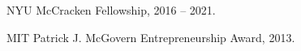 \documentclass[11pt,article,oneside]{memoir}
\begin{document}
\bigskip


\ind NYU McCracken Fellowship, 2016 -- 2021.

\ind MIT Patrick J. McGovern Entrepreneurship Award, 2013.


%
%





%


\end{document}
